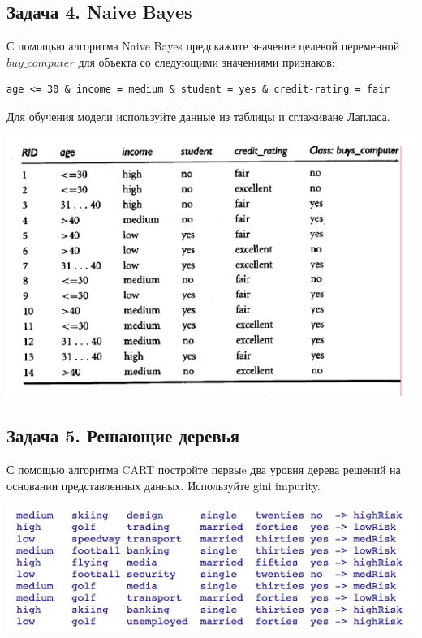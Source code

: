 \documentclass[12pt,a4paper]{article}
\begin{document}
\newpage

\subsection*{Задача 4.  Naive Bayes}

С помощью алгоритма Naive Bayes предскажите значение целевой переменной $buy\_computer$ для объекта со следующими значениями признаков:

\begin{verbatim}
age <= 30 & income = medium & student = yes & credit-rating = fair
\end{verbatim}

Для обучения модели используйте данные из таблицы и сглаживане Лапласа.

\begin{center}
\includegraphics[scale=0.8]{images/nb.png}
\end{center}

\subsection*{Задача 5.  Решающие деревья}

С помощью алгоритма CART постройте первыe два уровня дерева решений на основании представленных данных. Используйте gini impurity.

\begin{center}
\includegraphics[scale=0.8]{images/dt.png}
\end{center}
\end{document}
